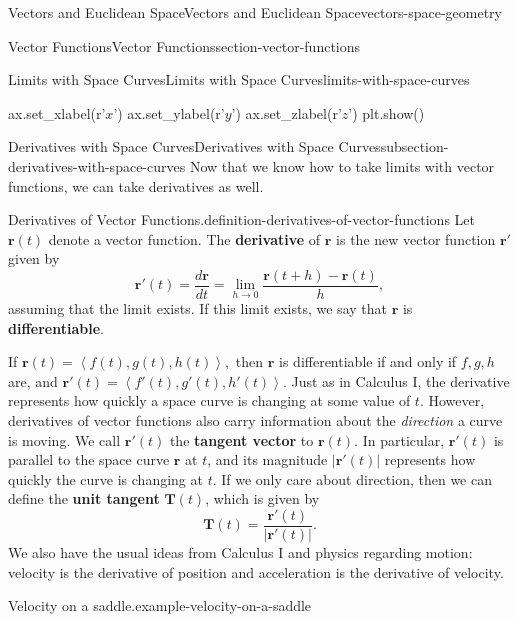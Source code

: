 \documentclass[oneside,10pt,]{book}
\newcommand{\terminology}[1]{\textbf{#1}}
\numberwithin{equation}{section}
\newcommand{\vv}[1]{\mathbf{#1}}
\newcommand{\dotprod}[1]{\left\langle #1 \right\rangle}
\begin{document}
\begin{chapterptx}{Vectors and Euclidean Space}{}{Vectors and Euclidean Space}{}{}{vectors-space-geometry}
\begin{sectionptx}{Vector Functions}{}{Vector Functions}{}{}{section-vector-functions}
\begin{subsectionptx}{Limits with Space Curves}{}{Limits with Space Curves}{}{}{limits-with-space-curves}
\begin{sageinput}
ax.set_xlabel(r'$x$')
ax.set_ylabel(r'$y$')
ax.set_zlabel(r'$z$')
plt.show()
\end{sageinput}
\end{subsectionptx}
%
%
\typeout{************************************************}
\typeout{************************************************}
%
\begin{subsectionptx}{Derivatives with Space Curves}{}{Derivatives with Space Curves}{}{}{subsection-derivatives-with-space-curves}
\hypertarget{p-1262}{}%
Now that we know how to take limits with vector functions, we can take derivatives as well.%
\begin{definition}{Derivatives of Vector Functions.}{definition-derivatives-of-vector-functions}%
\hypertarget{p-1263}{}%
Let \(\vv{r}(t)\) denote a vector function. The \terminology{derivative} of \(\vv{r}\) is the new vector function \(\vv{r}'\) given by%
%
\begin{equation*}
\vv{r}'(t) = \frac{d\vv{r}}{dt} = \lim_{h\to0}\frac{\vv{r}(t+h)-\vv{r}(t)}{h},
\end{equation*}
\hypertarget{p-1264}{}%
assuming that the limit exists. If this limit exists, we say that \(\vv{r}\) is \terminology{differentiable}.%
\end{definition}
\hypertarget{p-1265}{}%
If \(\vv{r}(t) = \dotprod{f(t),g(t),h(t)},\) then \(\vv{r}\) is differentiable if and only if \(f,g,h\) are, and \(\vv{r}'(t) = \dotprod{f'(t),g'(t),h'(t)}.\) Just as in Calculus I, the derivative represents how quickly a space curve is changing at some value of \(t\). However, derivatives of vector functions also carry information about the \emph{direction} a curve is moving. We call \(\vv{r}'(t)\) the \terminology{tangent vector} to \(\vv{r}(t)\). In particular, \(\vv{r}'(t)\) is parallel to the space curve \(\vv{r}\) at \(t\), and its magnitude \(|\vv{r}'(t)|\) represents how quickly the curve is changing at \(t\). If we only care about direction, then we can define the \terminology{unit tangent} \(\vv{T}(t)\), which is given by%
%
\begin{equation*}
\vv{T}(t) = \frac{\vv{r}'(t)}{|\vv{r}'(t)|}.
\end{equation*}
\hypertarget{p-1266}{}%
We also have the usual ideas from Calculus I and physics regarding motion: velocity is the derivative of position and acceleration is the derivative of velocity.%
\begin{example}{Velocity on a saddle.}{example-velocity-on-a-saddle}%

\end{example}
\end{subsectionptx}
\end{sectionptx}
\end{chapterptx}
\end{document}
